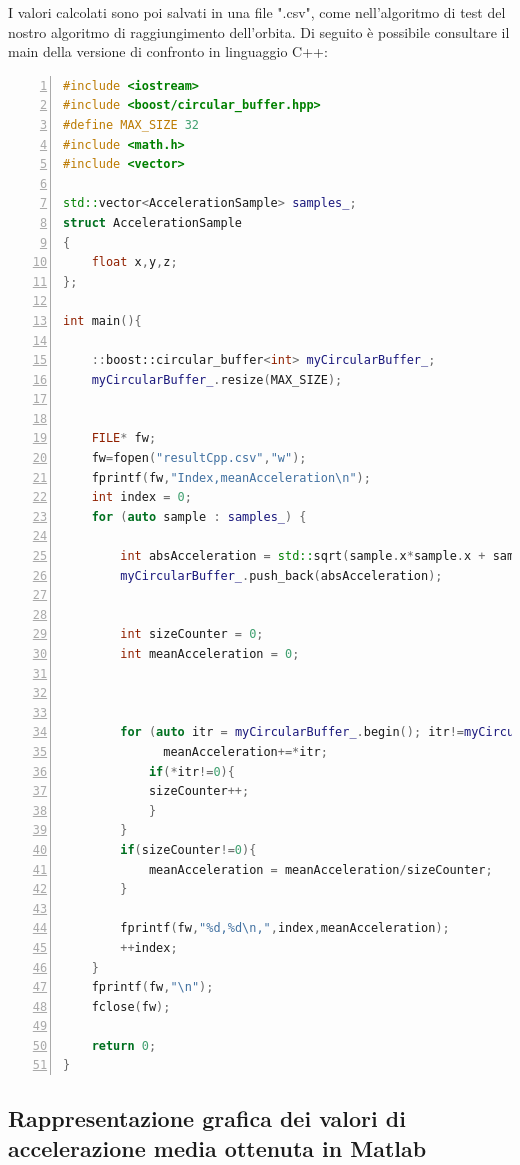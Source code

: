 \documentclass[LaM,binding=0.6cm,oneside]{../sapthesis}
\begin{document}
I valori calcolati sono poi salvati in una file ".csv", come nell'algoritmo di test del nostro algoritmo di raggiungimento dell'orbita.
\newline\newline
Di seguito è possibile consultare il main della versione di confronto in linguaggio C++:
\newline
\begin{lstlisting}[language=C++,
                   basicstyle=\scriptsize,
                   numbers=left,
                   stepnumber=0,
                   numbersep=4pt,
                   tabsize=2,
                   showspaces=false,
                   showstringspaces=false]
#include <iostream>
#include <boost/circular_buffer.hpp>
#define MAX_SIZE 32
#include <math.h>
#include <vector>

std::vector<AccelerationSample> samples_;
struct AccelerationSample
{
    float x,y,z;  
};

int main(){
    
    ::boost::circular_buffer<int> myCircularBuffer_;
    myCircularBuffer_.resize(MAX_SIZE);
    
    
    FILE* fw;
    fw=fopen("resultCpp.csv","w");
    fprintf(fw,"Index,meanAcceleration\n");
    int index = 0;
    for (auto sample : samples_) {
        
        int absAcceleration = std::sqrt(sample.x*sample.x + sample.y*sample.y + sample.z*sample.z);
        myCircularBuffer_.push_back(absAcceleration); 

        
        int sizeCounter = 0;
        int meanAcceleration = 0;
         
         
        
        for (auto itr = myCircularBuffer_.begin(); itr!=myCircularBuffer_.end() ; ++itr){
              meanAcceleration+=*itr;
            if(*itr!=0){
            sizeCounter++;
            }
        }
        if(sizeCounter!=0){
            meanAcceleration = meanAcceleration/sizeCounter;
        }
        
        fprintf(fw,"%d,%d\n,",index,meanAcceleration);
        ++index;
    }
    fprintf(fw,"\n");
    fclose(fw);
    
    return 0;
}

\end{lstlisting}
\newpage
\subsection{Rappresentazione grafica dei valori di accelerazione media ottenuta in Matlab}
\end{document}
